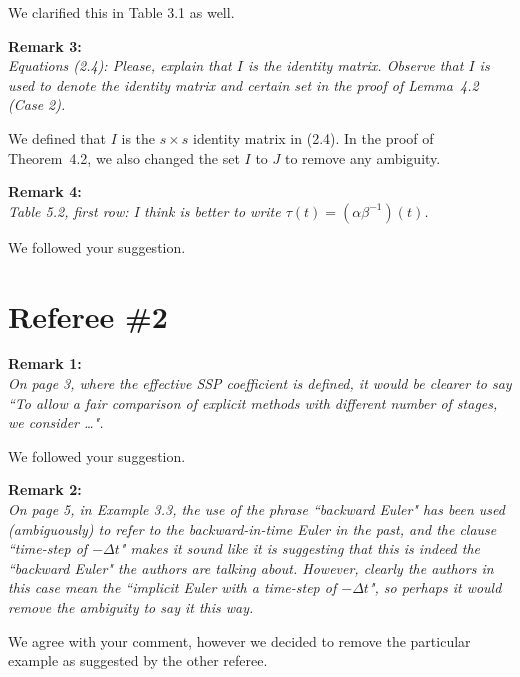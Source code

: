 \documentclass[12pt]{article}
\newcommand{\remark}[2]{\vspace{25pt} \noindent \textbf{Remark #1:\newline} \textit{#2}\vspace{15pt}}
\renewcommand{\newline}{\vspace{15pt}\\}
\begin{document}
We clarified this in Table 3.1 as well.

\remark{3}{
Equations (2.4): Please, explain that $I$ is the identity matrix. Observe that $I$ is used to
denote the identity matrix and certain set in the proof of Lemma~4.2 (Case 2).}

We defined that $I$ is the $s \times s$ identity matrix in (2.4).
In the proof of Theorem~4.2, we also changed the set $I$ to $J$ to remove any ambiguity.

\remark{4}{
Table 5.2, first row: I think is better to write $\tau(t) = (\alpha\beta^{-1})(t)$.}

We followed your suggestion.

\vspace{50pt}

\section*{Referee \#2}
\remark{1}{
On page 3, where the effective SSP coefficient is defined, it would be clearer to say
``To allow a fair comparison of explicit methods with different number of stages, we consider \dots". }

We followed your suggestion.

\remark{2}{
On page 5, in Example 3.3, the use of the phrase ``backward Euler" has been used 
(ambiguously) to refer to the backward-in-time Euler in the past, and the clause 
``time-step of $-\Delta t$" makes it sound like it is suggesting that this is indeed 
the ``backward Euler" the authors are talking about. 
However, clearly the authors in this case mean the ``implicit Euler with a time-step 
of $-\Delta t$", so perhaps it would remove the ambiguity to say it this way.}

We agree with your comment, however we decided to remove the particular example 
as suggested by the other referee.
\end{document}

